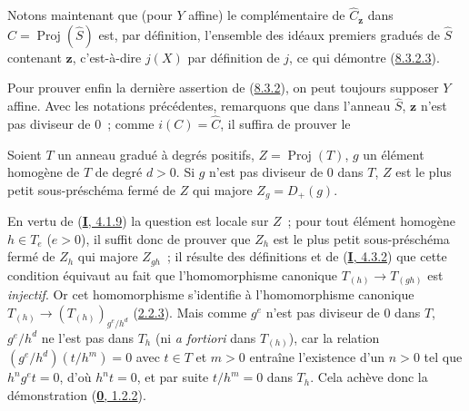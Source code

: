 Notons maintenant que (pour $Y$ affine) le complémentaire de
$\widehat{C}_{\mathbf{z}}$ dans $\widehat{C}=\operatorname{Proj}(\widehat{S})$
est, par définition, l'ensemble des idéaux premiers gradués de $\widehat{S}$
contenant $\mathbf{z}$, c'est-à-dire $j(X)$ par définition de $j$, ce qui démontre
(\hyperref[II.8.3.2.3-fr]{8.3.2.3}).

Pour prouver enfin la dernière assertion de
(\hyperref[II.8.3.2-fr]{8.3.2}), on peut toujours supposer $Y$ affine. Avec
les notations précédentes, remarquons que dans l'anneau $\widehat{S}$, $\mathbf{z}$
n'est pas diviseur de $0$~; comme $i(C)=\widehat{C}$, il suffira
de prouver le

\begin{lemma}[8.3.2.7]
\label{II.8.3.2.7-fr}
Soient $T$ un anneau gradué à degrés positifs,
$Z=\operatorname{Proj}(T)$, $g$ un élément homogène de $T$ de degré $d>0$.
Si $g$ n'est pas diviseur de $0$ dans $T$, $Z$ est le plus petit
sous-préschéma fermé de $Z$ qui majore $Z_g=D_+(g)$.
\end{lemma}

En vertu de (\hyperref[I.4.1.9-fr]{\textbf{I}, 4.1.9}) la question est locale sur $Z$~;
pour tout élément homogène $h\in T_e$ ($e>0$), il suffit donc de prouver que
$Z_h$ est le plus petit sous-préschéma fermé de $Z_h$ qui majore $Z_{gh}$~;
il résulte des définitions et de (\hyperref[I.4.3.2-fr]{\textbf{I}, 4.3.2}) que cette
condition équivaut au fait que l'homomorphisme canonique
$T_{(h)}\to T_{(gh)}$ est \emph{injectif}. Or cet homomorphisme s'identifie à
l'homomorphisme canonique
$T_{(h)}\to(T_{(h)})_{g^e/h^d}$ (\hyperref[II.2.2.3-fr]{2.2.3}). Mais comme
$g^e$ n'est pas diviseur de $0$ dans $T$, $g^e/h^d$ ne l'est pas dans $T_h$
(ni \emph{a fortiori} dans $T_{(h)}$), car la relation
$(g^e/h^d)(t/h^m)=0$ avec $t\in T$ et $m>0$ entraîne l'existence d'un $n>0$
tel que $h^ng^et=0$, d'où $h^nt=0$, et par suite $t/h^m=0$ dans $T_h$. Cela
achève donc la démonstration (\hyperref[0.1.2.2-fr]{\textbf{0}, 1.2.2}).

